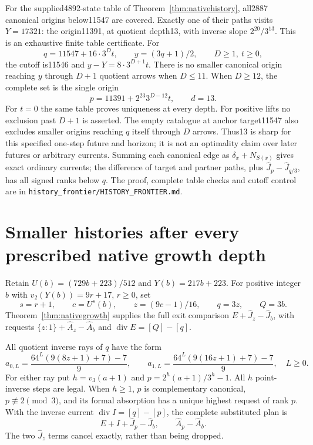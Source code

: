 \documentclass[11pt]{article}
\begin{document}
For the supplied4892-state table of Theorem~\ref{thm:nativehistory},
all2887 canonical origins below11547 are covered. Exactly one of
their paths visits $Y=17321$: the origin11391, at quotient depth13,
with inverse slope $2^{20}/3^{13}$. This is an exhaustive finite
table certificate. For
\[
 q=11547+16\cdot3^Dt,\qquad y=(3q+1)/2,\qquad D\ge1,\ t\ge0,
 \tag{HF4}
\]
the cutoff is11546 and $y-Y=8\cdot3^{D+1}t$.
There is no smaller canonical origin reaching $y$ through $D+1$
quotient arrows when $D\le11$. When $D\ge12$, the complete set is
the single origin
\[
 p=11391+2^{23}3^{D-12}t,\qquad d=13.
\]
For $t=0$ the same table proves uniqueness at every depth.
For positive lifts no exclusion past $D+1$ is asserted.
The empty catalogue at anchor target11547 also excludes smaller
origins reaching $q$ itself through $D$ arrows.
Thus13 is sharp for this specified one-step future and horizon;
it is not an optimality claim over later futures or arbitrary currents.
Summing each canonical edge as $\delta_x+N_{S(x)}$ gives exact
ordinary currents; the difference of target and partner paths, plus
$\widehat J_p-\widehat J_{q/3}$, has all signed ranks below $q$.
The proof, complete table checks and cutoff control are in
\texttt{history\_frontier/HISTORY\_FRONTIER.md}.

\section{Smaller histories after every prescribed native growth depth}
Retain $U(b)=(729b+223)/512$ and $Y(b)=217b+223$.
For positive integer $b$ with $v_2(Y(b))=9r+17$, $r\ge0$, set
\[
 s=r+1,\qquad c=U^s(b),\qquad z=(9c-1)/16,\qquad
 q=3z,\qquad Q=3b.
\]
Theorem~\ref{thm:nativegrowth} supplies the full exit comparison
$E+\widehat J_z-\widehat J_b$, with requests
$\{z:1\}+\widehat A_z-\widehat A_b$ and
$\operatorname{div}E=[Q]-[q]$.

All quotient inverse rays of $q$ have the form
\[
 a_{0,L}=\frac{64^L(9(8z+1)+7)-7}{9},\qquad
 a_{1,L}=\frac{64^L(9(16z+1)+7)-7}{9},\quad L\ge0.
 \tag{GE1}
\]
For either ray put $h=v_3(a+1)$ and
$p=2^h(a+1)/3^h-1$. All $h$ point-inverse steps are legal.
When $h\ge1$, $p$ is complementary canonical, $p\not\equiv2\pmod3$,
and its formal absorption has a unique highest request of rank $p$.
With the inverse current $\operatorname{div}I=[q]-[p]$, the complete
substituted plan is
\[
 E+I+\widehat J_p-\widehat J_b,\qquad
 \widehat A_p-\widehat A_b.
 \tag{GE2}
\]
The two $\widehat J_z$ terms cancel exactly, rather than being dropped.
\end{document}
